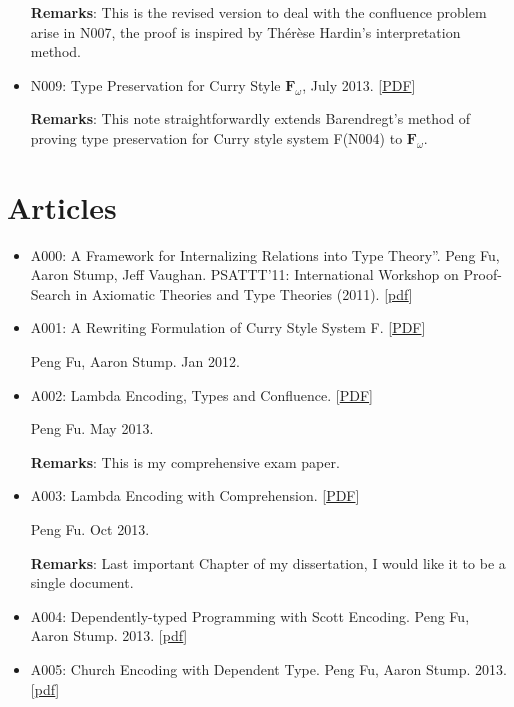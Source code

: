 \documentclass[10pt]{article}
\begin{document}
\begin{itemize}
\noindent \textbf{Remarks}: This is the revised version to deal with the confluence problem arise in N007, the proof is inspired by Thérèse Hardin's interpretation method. 

\item N009: Type Preservation for Curry Style $\mathbf{F}_{\omega}$, July 2013. [\href{../../document/notes/fomega-presv.pdf}{PDF}]

\noindent \textbf{Remarks}: This note straightforwardly extends Barendregt's method of proving type preservation for Curry style system F(N004) to $\mathbf{F}_{\omega}$. 


  
\end{itemize}

\section*{Articles}

\begin{itemize}

\item A000: A Framework for Internalizing Relations into Type Theory''. Peng Fu, Aaron Stump, Jeff Vaughan. PSATTT'11: International Workshop on Proof-Search in Axiomatic Theories and Type Theories (2011). [\href{../../document/papers/psattt-paper.pdf}{pdf}]

\item A001: A Rewriting Formulation of Curry Style System F. [\href{../../document/notes/rewrite-f.pdf}{PDF}]

\noindent Peng Fu, Aaron Stump. Jan 2012.

\item A002: Lambda Encoding, Types and Confluence. [\href{../../document/notes/comp-exam.pdf}{PDF}]

\noindent Peng Fu. May 2013.

\noindent \textbf{Remarks}: This is my comprehensive exam paper. 

\item A003: Lambda Encoding with Comprehension. [\href{../../document/notes/comprehension.pdf}{PDF}]

\noindent Peng Fu. Oct 2013.

\noindent \textbf{Remarks}: Last important Chapter of my dissertation, I would like it to be
a single document. 

\item A004: Dependently-typed Programming with Scott Encoding. Peng Fu, Aaron Stump. 2013. [\href{../../document/papers/scott-dep.pdf}{pdf}]

\item A005: Church Encoding with Dependent Type. Peng Fu, Aaron Stump. 2013. [\href{../../document/papers/church-dep.pdf}{pdf}]


\end{itemize}
\end{document}
